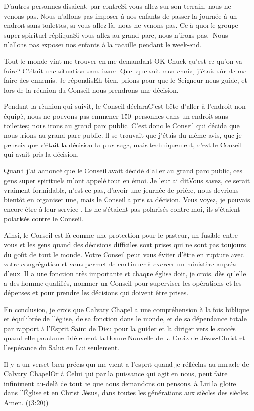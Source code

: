 D'autres personnes disaient, par contre\frcolon\og Si vous allez sur son terrain, nous ne venons pas. Nous n’allons pas imposer
à nos enfants de passer la journée à un endroit sans toilettes, si vous allez là, nous ne venons pas. Ce à quoi le
groupe \og super spirituel \fg{} répliqua\frcolon\og Si vous allez au grand parc, nous n’irons pas. !Nous n’allons pas exposer nos
enfants à la racaille pendant le week-end.\fg{}

Tout le monde vint me trouver en me demandant \og OK Chuck qu’est ce qu’on va faire?\fg{} C’était une situation sans
issue. Quel que soit mon choix, j'étais sûr de me faire des ennemis. Je répondis\frcolon\og Eh bien, prions pour que le
Seigneur nous guide, et lors de la réunion du Conseil nous prendrons une décision.\fg{}

Pendant la réunion qui suivit, le Conseil déclara\frcolon\og C’est bête d’aller à l’endroit non équipé, nous ne pouvons pas
emmener 150~personnes dans un endroit sans toilettes; nous irons au grand parc public.\fg{} C’est donc le Conseil qui
décida que nous irions au grand parc public. Il se trouvait que j’étais du même avis, que je pensais que c’était la
décision la plus sage, mais techniquement, c’est le Conseil qui avait pris la décision.

Quand j'ai annoncé que le Conseil avait décidé d’aller au grand parc public, ces gens super spirituels m’ont appelé
tout en émoi. Je leur ai dit\frcolon\og Vous savez, ce serait vraiment formidable, n’est ce pas, d’avoir une journée de prière,
nous devrions bientôt en organiser une, mais le Conseil a pris sa décision.\fg{} Vous voyez, je pouvais encore être à leur
service . Ils ne s'étaient pas polarisés contre moi, ils s'étaient polarisés contre le Conseil.

Ainsi, le Conseil est là comme une protection pour le pasteur, un fusible entre vous et les gens quand des décisions
difficiles sont prises qui ne sont pas toujours du goût de tout le monde. Votre Conseil peut vous éviter d’être en
rupture avec votre congrégation et vous permet de continuer à exercer un ministère auprès d’eux. Il a une fonction
très importante et chaque église doit, je crois, dès qu’elle a des homme qualifiés, nommer un Conseil pour superviser
les opérations et les dépenses et pour prendre les décisions qui doivent être prises.

En conclusion, je crois que Calvary Chapel a une compréhension à la fois biblique et équilibrée de l'église, de sa
fonction dans le monde, et de sa dépendance totale par rapport à l’Esprit Saint de Dieu pour la guider et la diriger
vers le succès quand elle proclame fidèlement la Bonne Nouvelle de la Croix de Jésus-Christ et l’espérance du Salut en
Lui seulement.

Il y a un verset bien précis qui me vient à l’esprit quand je réfléchis au miracle de Calvary Chapel\frcolon\og Or à Celui qui par
la puissance qui agit en nous, peut faire infiniment au-delà de tout ce que nous demandons ou pensons, à Lui la
gloire dans l’Église et en Christ Jésus, dans toutes les générations aux siècles des siècles. Amen.\fg{} ((3:20))
